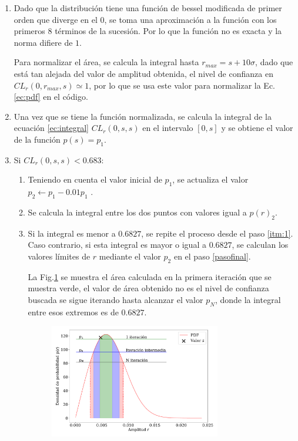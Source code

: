 \begin{enumerate}
    \item 
    Dado que la distribución tiene una función de bessel modificada de primer orden que diverge en el 0, se toma una aproximación a la función con los primeros 8 términos de la sucesión. Por lo que la función no es exacta y la norma difiere de $1$. 
    
    Para normalizar el área, se calcula la integral hasta $r_{max}=s +  10\sigma$, dado que está tan alejada del valor de amplitud obtenida, el nivel de confianza en $CL_r(0,r_{max},s)\simeq 1$, por lo que se  usa este valor para normalizar la Ec. \ref{ec:pdf} en el código.

    \item Una vez que se tiene la función normalizada, se calcula la integral de la ecuación \ref{ec:integral} $CL_r(0,s,s)$ en el intervalo  $[0,s]$ y se obtiene el valor de la función $p(s)=p_1$.

    \item Si $CL_r(0,s,s)< 0.683$:
    \begin{enumerate}
        \item Teniendo en cuenta el valor inicial de $p_1$, se actualiza el valor  $p_2 \leftarrow p_1 - 0.01 p_1$ \label{itm:1}.
        \item Se calcula la integral entre los dos puntos con valores igual a $p(r)_2$. 
        \item \label{itm:3} Si la integral es menor a $0.6827$, se repite el proceso desde el paso \ref{itm:1}. Caso contrario, si esta integral es mayor o igual a $0.6827$, se calculan los valores límites de $r$ mediante el valor $p_2$ en el paso \ref{pasofinal}. 

        La Fig.\ref{fig:itera} se muestra el área calculada en la primera iteración que se muestra verde, el valor de área obtenido no es el nivel de confianza buscada se sigue iterando hasta alcanzar el valor $p_N$, donde la integral entre esos extremos es de $0.6827$.
        \begin{figure}[H]
            \begin{small}
                \begin{center}
                    \includegraphics[width=0.75\textwidth]{bessel_prob_iterations_v2.pdf}
                \end{center}
                \caption{}
                \label{fig:itera}
            \end{small}
            

\end{figure}
\end{enumerate}
\end{enumerate}
